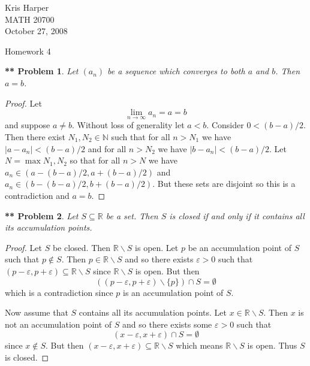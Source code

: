 \documentclass{article}
\newtheorem{**}{** Problem}
\begin{document}
\begin{flushright}
Kris Harper\\

MATH 20700\\

October 27, 2008
\end{flushright}

\begin{center}
Homework 4
\end{center}

\begin{flushleft}

\begin{**}
Let $(a_n)$ be a sequence which converges to both $a$ and $b$. Then $a = b$.
\end{**}
\begin{proof}
Let
\[
\lim_{n \rightarrow \infty} a_n = a = b
\]
and suppose $a \neq b$. Without loss of generality let $a<b$. Consider $0 < (b-a)/2$. Then there exist $N_1, N_2 \in \mathbb{N}$ such that for all $n>N_1$ we have $|a-a_n| < (b-a)/2$ and for all $n>N_2$ we have $|b-a_n| < (b-a)/2$. Let $N = \max{N_1,N_2}$ so that for all $n>N$ we have $a_n \in (a-(b-a)/2 , a + (b-a)/2)$ and $a_n \in (b-(b-a)/2 , b + (b-a)/2)$. But these sets are disjoint so this is a contradiction and $a = b$.
\end{proof}

\begin{**}
Let $S \subseteq \mathbb{R}$ be a set. Then $S$ is closed if and only if it contains all its accumulation points.
\end{**}
\begin{proof}
Let $S$ be closed. Then $\mathbb{R} \backslash S$ is open. Let $p$ be an accumulation point of $S$ such that $p \notin S$. Then $p \in \mathbb{R} \backslash S$ and so there exists $\varepsilon > 0$ such that $(p - \varepsilon, p + \varepsilon) \subseteq \mathbb{R} \backslash S$ since $\mathbb{R} \backslash S$ is open. But then
\[
((p - \varepsilon, p + \varepsilon) \backslash \{p\} ) \cap S = \emptyset
\]
which is a contradiction since $p$ is an accumulation point of $S$.\newline

Now assume that $S$ contains all its accumulation points. Let $x \in \mathbb{R} \backslash S$. Then $x$ is not an accumulation point of $S$ and so there exists some $\varepsilon > 0$ such that
\[
(x - \varepsilon, x + \varepsilon) \cap S = \emptyset
\]
since $x \notin S$. But then $(x - \varepsilon, x + \varepsilon) \subseteq \mathbb{R} \backslash S$ which means $\mathbb{R} \backslash S$ is open. Thus $S$ is closed.
\end{proof}


\end{flushleft}
\end{document}
